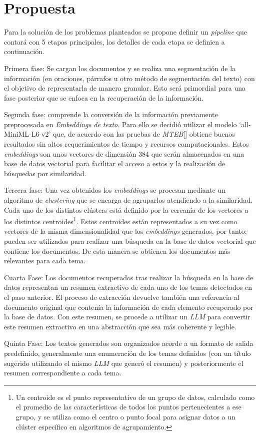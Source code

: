 \chapter{Propuesta}\label{chapter:proposal}
    Para la solución de los problemas planteados se propone definir un \emph{pipeline} que contará con 5 etapas principales, los detalles de cada etapa se definien a continuación.

    Primera fase: Se cargan los documentos y se realiza una segmentación de la información (en oraciones, párrafos u otro método de segmentación del texto) con el objetivo de representarla de manera granular. Esto será primordial para una fase posterior que se enfoca en la recuperación de la información.
    
    Segunda fase: comprende la conversión de la información previamente preprocesada en \emph{Embeddings de texto}. Para ello se decidió utilizar el modelo `all-MiniML-L6-v2' que, de acuerdo con las pruebas de \emph{MTEB}[\cite{leaderboard}] obtiene buenos resultados sin altos requerimientos de tiempo y recursos computacionales. Estos \emph{embeddings} son unos vectores de dimensión 384 que serán almacenados en una base de datos vectorial para facilitar el acceso a estos y la realización de búsquedas por similaridad.

    Tercera fase: Una vez obtenidos los \emph{embeddings} se procesan  mediante un algoritmo de \emph{clustering} que se encarga de agruparlos atendiendo a la similaridad. Cada uno de los distintos clústers está definido por la cercanía de los vectores a los distintos centroides\footnote{Un centroide es el punto representativo de un grupo de datos, calculado como el promedio de las características de todos los puntos pertenecientes a ese grupo, y se utiliza como el centro o punto focal para asignar datos a un clúster específico en algoritmos de agrupamiento.}. Estos centroides están representados a su vez como vectores de la misma dimensionalidad que los \emph{embeddings} generados, por tanto; pueden ser utilizados para realizar una búsqueda en la base de datos vectorial que contiene los documentos. De esta manera se obtienen los documentos más relevantes para cada tema.

    Cuarta Fase: Los documentos recuperados tras realizar la búsqueda en la base de datos representan un resumen extractivo de cada uno de los temas detectados en el paso anterior. El proceso de extracción devuelve también una referencia al documento original que contenía la información de cada elemento recuperado por la base de datos. Con este resumen, se procede a utilizar un \emph{LLM} para convertir este resumen extractivo en una abstracción que sea más coherente y legible.

    Quinta Fase: Los textos generados son organizados acorde a un formato de salida predefinido, generalmente una enumeración de los temas definidos (con un título sugerido utilizando el mismo \emph{LLM} que generó el resumen) y posteriormente el resumen correspondiente a cada tema.
